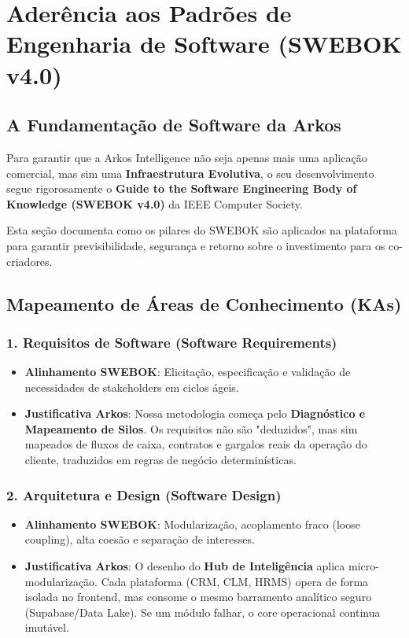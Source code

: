 \documentclass[12pt,a4paper,oneside]{report}
\begin{document}
\chapter{Aderência aos Padrões de Engenharia de Software (SWEBOK v4.0)}

\section{A Fundamentação de Software da Arkos}
Para garantir que a Arkos Intelligence não seja apenas mais uma aplicação comercial, mas sim uma \textbf{Infraestrutura Evolutiva}, o seu desenvolvimento segue rigorosamente o \textbf{Guide to the Software Engineering Body of Knowledge (SWEBOK v4.0)} da IEEE Computer Society. 

Esta seção documenta como os pilares do SWEBOK são aplicados na plataforma para garantir previsibilidade, segurança e retorno sobre o investimento para os co-criadores.

\section{Mapeamento de Áreas de Conhecimento (KAs)}

\subsection{1. Requisitos de Software (Software Requirements)}
\begin{itemize}
    \item \textbf{Alinhamento SWEBOK}: Elicitação, especificação e validação de necessidades de stakeholders em ciclos ágeis.
    \item \textbf{Justificativa Arkos}: Nossa metodologia começa pelo \textbf{Diagnóstico e Mapeamento de Silos}. Os requisitos não são "deduzidos", mas sim mapeados de fluxos de caixa, contratos e gargalos reais da operação do cliente, traduzidos em regras de negócio determinísticas.
\end{itemize}

\subsection{2. Arquitetura e Design (Software Design)}
\begin{itemize}
    \item \textbf{Alinhamento SWEBOK}: Modularização, acoplamento fraco (loose coupling), alta coesão e separação de interesses.
    \item \textbf{Justificativa Arkos}: O desenho do \textbf{Hub de Inteligência} aplica micro-modularização. Cada plataforma (CRM, CLM, HRMS) opera de forma isolada no frontend, mas consome o mesmo barramento analítico seguro (Supabase/Data Lake). Se um módulo falhar, o core operacional continua imutável.
\end{itemize}
\end{document}
